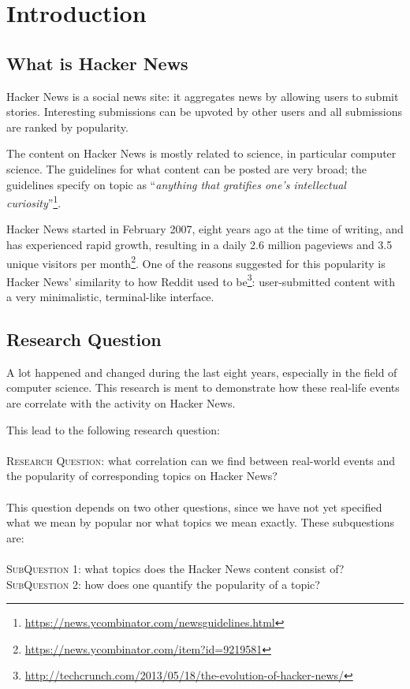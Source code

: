 \section{Introduction}
\subsection{What is Hacker News}
Hacker News is a social news site: it aggregates news by allowing users to submit stories. Interesting submissions can be upvoted by other users and all submissions are ranked by popularity.

The content on Hacker News is mostly related to science, in particular computer science. The guidelines for what content can be posted are very broad; the guidelines specify on topic as ``\textit{anything that gratifies one's intellectual curiosity}''\footnote{\url{https://news.ycombinator.com/newsguidelines.html}}.

Hacker News started in February 2007, eight years ago at the time of writing, and has experienced rapid growth, resulting in a daily 2.6 million pageviews and 3.5 unique visitors per month\footnote{\url{https://news.ycombinator.com/item?id=9219581}}. One of the reasons suggested for this popularity is Hacker News' similarity to how Reddit used to be\footnote{\url{http://techcrunch.com/2013/05/18/the-evolution-of-hacker-news/}}: user-submitted content with a very minimalistic, terminal-like interface.

\subsection{Research Question}
A lot happened and changed during the last eight years, especially in the field of computer science. This research is ment to demonstrate how these real-life events are correlate with the activity on Hacker News.

This lead to the following research question:\\
\\
\textsc{Research Question:} what correlation can we find between real-world events and the popularity of corresponding topics on Hacker News?\\
\\
This question depends on two other questions, since we have not yet specified what we mean by popular nor what topics we mean exactly. These subquestions are:\\
\\
\textsc{SubQuestion 1:} what topics does the Hacker News content consist of?\\
\textsc{SubQuestion 2:} how does one quantify the popularity of a topic?

